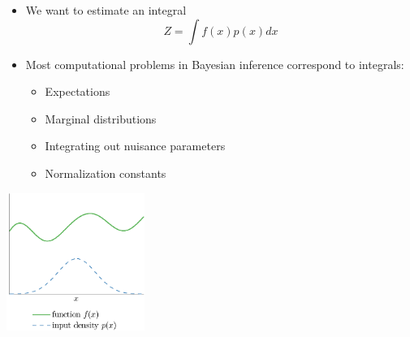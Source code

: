 \documentclass[usenames,dvipsnames]{beamer}
\begin{document}
\begin{frame}[plain, t]
	\titlebodyskip
	\headerbar
	{

	}
	\bodyheaderskip
	\slidebody
	{
		\columnbody{\standardtwocolumnwidth}
		{		
			\begin{itemize}
		\item We want to estimate an integral $$Z = \int f(x) p(x) dx$$		
		\item Most computational problems in Bayesian inference correspond to integrals:
			\begin{itemize}
			\item Expectations
			\item Marginal distributions
			\item Integrating out nuisance parameters
			\item Normalization constants
		\end{itemize}			
	
			\end{itemize}   		
		}
		\spacer{\standardspace}
		\columnbody{\standardtwocolumnwidth}
		{
			\vskip10pt
       		\includegraphics[width=4.5cm]{figures/samples/no_sample}	
		}
	}
\end{frame}
\end{document}
